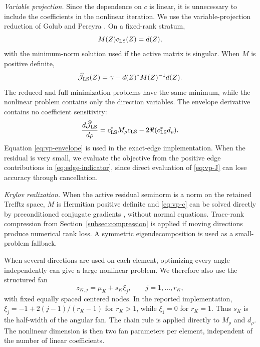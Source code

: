 \documentclass[pdflatex,sn-mathphys-num]{sn-jnl}
\theoremstyle{thmstyleone}
\theoremstyle{thmstyletwo}
\begin{document}
\medskip\noindent\textit{Variable projection.}
Since the dependence on $c$ is linear, it is unnecessary to include the coefficients in the nonlinear iteration.  We use the variable-projection reduction of Golub and Pereyra \cite{GolubPereyra1973}.  On a fixed-rank stratum,
\begin{equation}\label{eq:vp-c}
 {M(Z)c_{\rm LS}(Z)=d(Z),}
\end{equation}
with the minimum-norm solution used if the active matrix is singular.  When $M$ is positive definite,
\begin{equation}\label{eq:vp-J}
 {
 \widehat{\mathcal J}_{\rm LS}(Z)
 =\gamma-d(Z)^*M(Z)^{-1}d(Z).}
\end{equation}
The reduced and full minimization problems have the same minimum, while the nonlinear problem contains only the direction variables.  The envelope derivative contains no coefficient sensitivity:
\begin{equation}\label{eq:vp-envelope}
 {
 \frac{d\widehat{\mathcal J}_{\rm LS}}{d\rho}
 =c_{\rm LS}^*M_\rho c_{\rm LS}
 -2\Re(c_{\rm LS}^*d_\rho).}
\end{equation}
Equation \eqref{eq:vp-envelope} is used in the exact-edge implementation.  When the residual is very small, we evaluate the objective from the positive edge contributions in \eqref{eq:edge-indicator}, since direct evaluation of \eqref{eq:vp-J} can lose accuracy through cancellation.

\medskip\noindent\textit{Krylov realization.}
When the active residual seminorm is a norm on the retained Trefftz space, $M$ is Hermitian positive definite and \eqref{eq:vp-c} can be solved directly by preconditioned conjugate gradients \cite{HestenesStiefel1952,MonkWang1999}, without normal equations.  Trace-rank compression from Section~\ref{subsec:compression} is applied if moving directions produce numerical rank loss.  A symmetric eigendecomposition is used as a small-problem fallback.

When several directions are used on each element, optimizing every angle independently can give a large nonlinear problem.  We therefore also use the structured fan
\begin{equation}\label{eq:fan}
 z_{K,j}=\mu_K+s_K\xi_j,
 \qquad j=1,\ldots,r_K,
\end{equation}
with fixed equally spaced centered nodes.  In the reported implementation, $\xi_j=-1+2(j-1)/(r_K-1)$ for $r_K>1$, while $\xi_1=0$ for $r_K=1$.  Thus $s_K$ is the half-width of the angular fan.  The chain rule is applied directly to $M_\rho$ and $d_\rho$.  The nonlinear dimension is then two fan parameters per element, independent of the number of linear coefficients.
\end{document}
